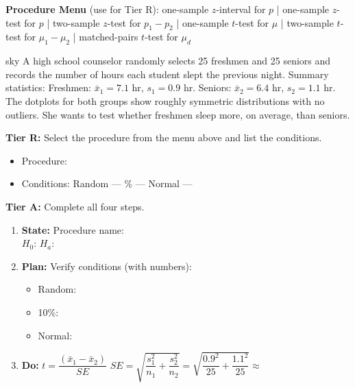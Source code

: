 \documentclass[10pt]{article}
\begin{document}
\namepartnerperiod

\vspace{0.10in}

\textbf{Procedure Menu} (use for Tier R): one-sample $z$-interval for $p$ \;|\;
one-sample $z$-test for $p$ \;|\; two-sample $z$-test for $p_1-p_2$ \;|\;
one-sample $t$-test for $\mu$ \;|\; two-sample $t$-test for $\mu_1-\mu_2$ \;|\;
matched-pairs $t$-test for $\mu_d$

\vspace{0.08in}

\begin{scenariobox}{sky}
A high school counselor randomly selects 25 freshmen and 25 seniors and records the
number of hours each student slept the previous night. Summary statistics:
Freshmen: $\bar x_1 = 7.1$ hr, $s_1 = 0.9$ hr. \;
Seniors: $\bar x_2 = 6.4$ hr, $s_2 = 1.1$ hr.
The dotplots for both groups show roughly symmetric distributions with no outliers.
She wants to test whether freshmen sleep more, on average, than seniors.

\textbf{Tier R:} Select the procedure from the menu above and list the conditions.
\begin{itemize}
  \item Procedure: 
  \item Conditions: Random ---  \% ---  \; Normal --- 
\end{itemize}

\textbf{Tier A:} Complete all four steps.
\begin{enumerate}
  \item \textbf{State:} Procedure name: \\
        $H_0$:  \quad $H_a$: 
  \item \textbf{Plan:} Verify conditions (with numbers):
        \begin{itemize}
          \item Random: 
          \item 10\%: 
          \item Normal: 
        \end{itemize}
  \item \textbf{Do:} $t = \dfrac{(\bar x_1 - \bar x_2)}{SE}$ \quad
        $SE = \sqrt{\dfrac{s_1^2}{n_1} + \dfrac{s_2^2}{n_2}} = \sqrt{\dfrac{0.9^2}{25} + \dfrac{1.1^2}{25}} \approx$ 


\end{enumerate}
\end{scenariobox}
\end{document}
